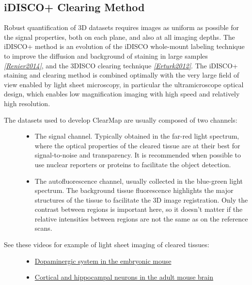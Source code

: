 \documentclass[letterpaper,10pt,english]{sphinxmanual}
\begin{document}
\subsection{iDISCO+ Clearing Method}
\label{introduction:idisco-clearing-method}
Robust quantification of 3D datasets requires images as uniform as possible for the signal properties, both on each plane, and also at all imaging depths. The iDISCO+ method is an evolution of the iDISCO whole-mount labeling technique to improve the diffusion and background of staining in large samples \label{introduction:id6}{\hyperref[introduction:renier2014]{\emph{{[}Renier2014{]}}}}, and the 3DISCO clearing technique \label{introduction:id7}{\hyperref[introduction:erturk2012]{\emph{{[}Erturk2012{]}}}}. The iDISCO+ staining and clearing method is combined optimally with the very large field of view enabled by light sheet microscopy, in particular the ultramicroscope optical design, which enables low magnification imaging with high speed and relatively high resolution.
\begin{description}
\item[{The datasets used to develop ClearMap are usually composed of two channels:}] \leavevmode\begin{itemize}
\item {} 
The signal channel. Typically obtained in the far-red light spectrum, where the optical properties of the cleared tissue are at their best for signal-to-noise and transparency. It is recommended when possible to use nuclear reporters or proteins to facilitate the object detection.

\item {} 
The autofluorescence channel, usually collected in the blue-green light spectrum. The background tissue fluorescence highlights the major structures of the tissue to facilitate the 3D image registration. Only the contrast between regions is important here, so it doesn’t matter if the relative intensities between regions are not the same as on the reference scans.

\end{itemize}

\item[{See these videos for example of light sheet imaging of cleared tissues:}] \leavevmode\begin{itemize}
\item {} 
\href{https://www.youtube.com/watch?v=-ctRUMQjizgvbLtLYkW6hI}{Dopaminergic system in the embryonic mouse}

\item {} 
\href{https://www.youtube.com/watch?v=vbLtLYkW6hI}{Cortical and hippocampal neurons in the adult mouse brain}

\end{itemize}

\end{description}
\end{document}
